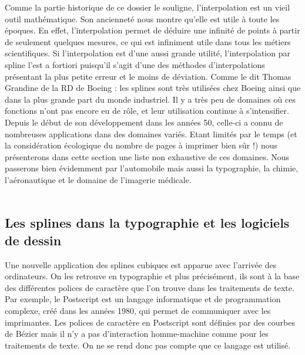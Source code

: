 \documentclass{article}
\begin{document}
Comme la partie historique de ce dossier le souligne, l'interpolation est un vieil outil math\'{e}matique. Son anciennet\'{e} nous montre qu'elle est utile \`a toute les \'{e}poques. En effet, l'interpolation permet de d\'{e}duire une infinit\'{e} de points \`a partir de seulement quelques mesures, ce qui est infiniment utile dans tous les m\'{e}tiers scientifiques. 
Si l'interpolation est d'une aussi grande utilit\'{e}, l'interpolation par spline l'est a fortiori puisqu'il s'agit d'une des m\'{e}thodes d'interpolations pr\'{e}sentant la plus petite erreur et le moins de d\'{e}viation. Comme le dit Thomas Grandine de la RD de Boeing : \guillemotleft  les splines sont tr\`{e}s utilis\'{e}es chez Boeing ainsi que dans la plus grande part du monde industriel. Il y a tr\`{e}s peu de domaines o\`u ces fonctions n'ont pas encore eu de r\^ole, et leur utilisation continue \`a s'intensifier.\guillemotright
\\Depuis le d\'{e}but de son d\'{e}veloppement dans les ann\'{e}es 50, celle-ci a connu de nombreuses applications dans des domaines vari\'{e}s. Etant limit\'{e}s par le temps (et la consid\'{e}ration \'{e}cologique du nombre de pages \`a imprimer bien s\^ur !) nous pr\'{e}senterons dans cette section une liste non exhaustive de ces domaines. Nous passerons bien \'{e}videmment par l'automobile mais aussi la typographie, la chimie, l'a\'{e}ronautique et le domaine de l'imagerie m\'{e}dicale.\\\\

\newpage
\begin{huge}
\subsection{Les splines dans la typographie et les logiciels de dessin}
\end{huge}

Une nouvelle application des splines cubiques est apparue avec l'arriv\'{e}e des ordinateurs. On les retrouve en typographie et plus pr\'{e}cis\'{e}ment, ils sont \`a la base des diff\'{e}rentes polices de caract\`{e}re que l'on trouve dans les traitements de texte. Par exemple, le Postscript est un langage informatique et de programmation complexe, cr\'{e}\'{e} dans les ann\'{e}es 1980, qui permet de communiquer avec les imprimantes. Les polices de caract\`{e}re en Postscript sont d\'{e}finies par des courbes de B\'{e}zier mais il n'y a pas d'interaction homme-machine comme pour les traitements de texte. On ne se rend donc pas compte que ce langage est utilis\'{e}.\\
\end{document}
